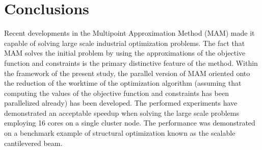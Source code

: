 \documentclass[runningheads,a4paper]{llncs}
\begin{document}
\section{Conclusions}

Recent developments in the Multipoint Approximation Method (MAM) made it capable of solving large scale industrial optimization problems. The fact that MAM solves the initial problem by using the approximations of the objective function and constraints is the primary distinctive feature of the method. Within the framework of the present study, the parallel version of MAM oriented onto the reduction of the worktime of the optimization algorithm (assuming that computing the values of the objective function and constraints has been parallelized already) has been developed. The performed experiments have demonstrated an acceptable speedup when solving the large scale problems employing 16 cores on a single cluster node. The performance was demonstrated on a benchmark example of structural 
optimization known as the scalable cantilevered beam. 

{}




%
%
%
%
%
%
%
%
%

\end{document}

